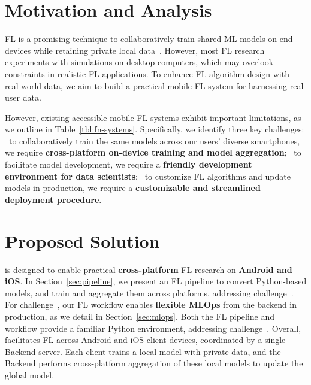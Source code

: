 \documentclass[conference]{IEEEtran}
\begin{document}

\section{Motivation and Analysis}

FL is a promising technique to collaboratively train shared ML models on
end devices while retaining private local data~\cite{wang2023federated}.
However, most FL research experiments with simulations on desktop computers,
which may overlook constraints in realistic FL applications.
To enhance FL algorithm design with real-world data,
we aim to build a practical mobile FL system for
harnessing real user data.

However,
existing accessible mobile FL systems exhibit important limitations,
as we outline in Table~\ref{tbl:fn-systems}.
Specifically, we identify three key challenges:
\challa~to collaboratively train the same models across
our users' diverse smartphones,
we require \textbf{cross-platform on-device training and model aggregation};
\challb~to facilitate model development,
we require a \textbf{friendly development environment for data scientists};
\challc~to customize FL algorithms and update models in production,
we require a \textbf{customizable and streamlined deployment procedure}.

\section{Proposed Solution}

\FedKit{} is designed to enable practical \textbf{cross-platform} FL research on
\textbf{Android and iOS}.
In Section~\ref{sec:pipeline},
we present an FL pipeline to convert Python-based models,
and train and aggregate them across platforms,
addressing challenge~\challa{}.
For challenge~\challc{},
our FL workflow enables \textbf{flexible MLOps} from the backend in production,
as we detail in Section~\ref{sec:mlops}.
Both the FL pipeline and workflow provide a familiar Python environment,
addressing challenge~\challb{}.
Overall,
\FedKit{} facilitates FL across Android and iOS client devices,
coordinated by a single Backend server.
Each client trains a local model with private data,
and the Backend performs cross-platform aggregation of these local models to update the global model.
\end{document}
